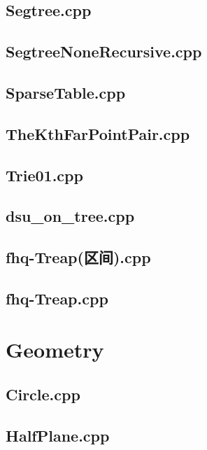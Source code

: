 \subsection{Segtree.cpp}

\subsection{SegtreeNoneRecursive.cpp}

\subsection{SparseTable.cpp}

\subsection{TheKthFarPointPair.cpp}

\subsection{Trie01.cpp}

\subsection{dsu\_on\_tree.cpp}

\subsection{fhq-Treap(区间).cpp}

\subsection{fhq-Treap.cpp}

\section{Geometry}
\subsection{Circle.cpp}

\subsection{HalfPlane.cpp}

